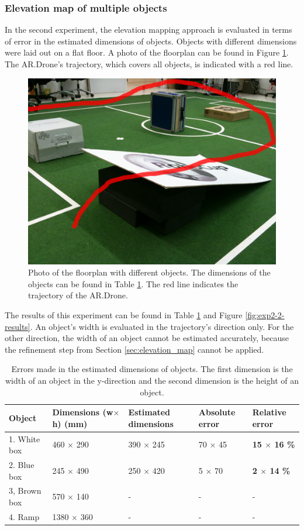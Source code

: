 \subsubsection{Elevation map of multiple objects}

In the second experiment, the elevation mapping approach is evaluated in terms of error in the estimated dimensions of objects.
Objects with different dimensions were laid out on a flat floor.
A photo of the floorplan can be found in Figure \ref{fig:exp2-setup}.
The AR.Drone's trajectory, which covers all objects, is indicated with a red line.

\begin{figure}[htb!]
\centering
\includegraphics[width=0.4\linewidth]{images/exp2-elevation-setup.jpg}
\caption{Photo of the floorplan with different objects. The dimensions of the objects can be found in Table \ref{tab:exp2}. The red line indicates the trajectory of the AR.Drone.}
\label{fig:exp2-setup}
\end{figure}

The results of this experiment can be found in Table \ref{tab:exp2} and Figure \ref{fig:exp2-2-results}.
An object's width is evaluated in the trajectory's direction only. 
For the other direction, the width of an object cannot be estimated accurately, because the refinement step from Section \ref{sec:elevation_map} cannot be applied.


\begin{table}[htb!]
    \centering
    \begin{tabular}
        { | l | l | l | l | l | } 
	\hline
	Object & Dimensions (w$\times$h) (\small{mm}) & Estimated dimensions & Absolute error & Relative error \\
        \hline
        1. White box	& 460 $\times$ 290	& 390 $\times$ 245	& 70 $\times$ 45	& \textbf{15 $\times$ 16 \%}\\
	2. Blue box	& 245 $\times$ 490	& 250 $\times$ 420	& 5 $\times$ 70	& \textbf{2 $\times$ 14 \%}\\
	3, Brown box	& 570 $\times$ 140	& - 					& - 				& - \\
	4. Ramp		& 1380 $\times$ 360	& - 					& - 				& - \\
	\hline
    \end{tabular}
    \caption{Errors made in the estimated dimensions of objects. The first dimension is the width of an object in the y-direction and the second dimension is the height of an object. }
    \label{tab:exp2}
\end{table}

